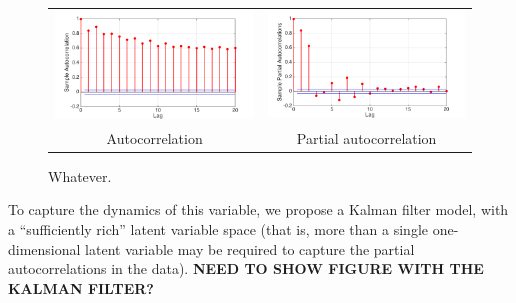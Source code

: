 \begin{figure}
\begin{center}
\begin{tabular}{c@{}c}
\includegraphics[scale=0.3]{./figures/VT_autoCorr_TRQ} &
\includegraphics[scale=0.3]{./figures/VT_partialAutoCorr_TRQ}  \\
Autocorrelation & Partial autocorrelation
\end{tabular}
\caption{\label{Figure:VTTorqueAutoCorr}  Whatever.}
\end{center}
\end{figure}


To capture the dynamics of this variable, we propose a Kalman filter model, with a ``sufficiently rich'' latent variable space (that is, more than a single one-dimensional latent variable may be required to capture the partial autocorrelations in the data).  {\bf NEED TO SHOW FIGURE WITH THE KALMAN FILTER?}




